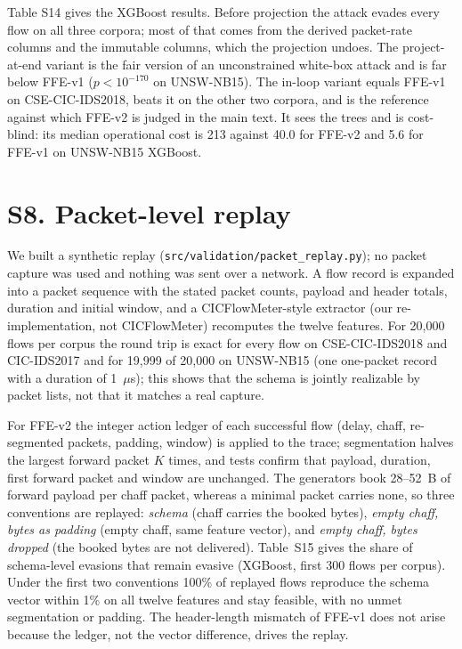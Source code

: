 Table S14 gives the XGBoost results. Before projection the attack evades every flow on all three corpora; most of that comes from the derived packet-rate columns and the immutable columns, which the projection undoes. The project-at-end variant is the fair version of an unconstrained white-box attack and is far below FFE-v1 ($p<10^{-170}$ on UNSW-NB15). The in-loop variant equals FFE-v1 on CSE-CIC-IDS2018, beats it on the other two corpora, and is the reference against which FFE-v2 is judged in the main text. It sees the trees and is cost-blind: its median operational cost is 213 against 40.0 for FFE-v2 and 5.6 for FFE-v1 on UNSW-NB15 XGBoost.

\section*{S8. Packet-level replay}

We built a synthetic replay (\texttt{src/validation/packet\_replay.py}); no packet capture was used and nothing was sent over a network. A flow record is expanded into a packet sequence with the stated packet counts, payload and header totals, duration and initial window, and a CICFlowMeter-style extractor (our re-implementation, not CICFlowMeter) recomputes the twelve features. For 20,000 flows per corpus the round trip is exact for every flow on CSE-CIC-IDS2018 and CIC-IDS2017 and for 19,999 of 20,000 on UNSW-NB15 (one one-packet record with a duration of 1~$\mu$s); this shows that the schema is jointly realizable by packet lists, not that it matches a real capture.

For FFE-v2 the integer action ledger of each successful flow (delay, chaff, re-segmented packets, padding, window) is applied to the trace; segmentation halves the largest forward packet $K$ times, and tests confirm that payload, duration, first forward packet and window are unchanged. The generators book 28--52~B of forward payload per chaff packet, whereas a minimal packet carries none, so three conventions are replayed: \emph{schema} (chaff carries the booked bytes), \emph{empty chaff, bytes as padding} (empty chaff, same feature vector), and \emph{empty chaff, bytes dropped} (the booked bytes are not delivered). Table~S15 gives the share of schema-level evasions that remain evasive (XGBoost, first 300 flows per corpus). Under the first two conventions 100\% of replayed flows reproduce the schema vector within 1\% on all twelve features and stay feasible, with no unmet segmentation or padding. The header-length mismatch of FFE-v1 does not arise because the ledger, not the vector difference, drives the replay.

